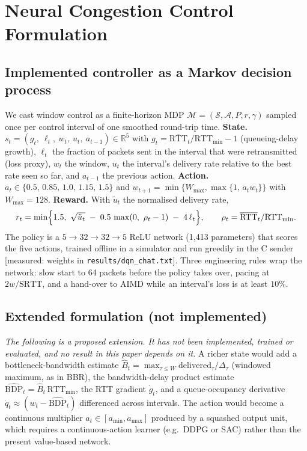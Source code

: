 
\section{Neural Congestion Control Formulation}
\label{sec:mdp}

\subsection{Implemented controller as a Markov decision process}
We cast window control as a finite-horizon MDP $\mathcal{M}=(\mathcal{S},\mathcal{A},P,r,\gamma)$ sampled once per control interval of one smoothed round-trip time.
\textbf{State.} $s_t=(g_t,\ \ell_t,\ w_t,\ u_t,\ a_{t-1})\in\mathbb{R}^5$ with
$g_t=\overline{\mathrm{RTT}}_t/\mathrm{RTT}_{\min}-1$ (queueing-delay growth),
$\ell_t$ the fraction of packets sent in the interval that were retransmitted (loss proxy),
$w_t$ the window, $u_t$ the interval's delivery rate relative to the best rate seen so far, and $a_{t-1}$ the previous action.
\textbf{Action.} $a_t\in\{0.5,\,0.85,\,1.0,\,1.15,\,1.5\}$ and $w_{t+1}=\min\{W_{\max},\max\{1,\,a_t w_t\}\}$ with $W_{\max}=128$.
\textbf{Reward.} With $\tilde u_t$ the normalised delivery rate,
\begin{equation}
r_t=\min\Bigl\{1.5,\ \sqrt{\tilde u_t}\;-\;0.5\,\max(0,\ \rho_t-1)\;-\;4\,\ell_t\Bigr\},\qquad \rho_t=\overline{\mathrm{RTT}}_t/\mathrm{RTT}_{\min}.
\end{equation}
The policy is a $5\!\to\!32\!\to\!32\!\to\!5$ ReLU network (1{,}413 parameters) that scores the five actions, trained offline in a simulator and run greedily in the C sender [measured: weights in \texttt{results/dqn\_chat.txt}].
Three engineering rules wrap the network: slow start to 64 packets before the policy takes over, pacing at $2w/\mathrm{SRTT}$, and a hand-over to AIMD while an interval's loss is at least $10\%$.

\subsection{Extended formulation (not implemented)}
\label{sec:mdp-ext}
\emph{The following is a proposed extension. It has not been implemented, trained or evaluated, and no result in this paper depends on it.}
A richer state would add a bottleneck-bandwidth estimate $\widehat{B}_t=\max_{\tau\le W}\mathrm{delivered}_\tau/\Delta_\tau$ (windowed maximum, as in BBR), the bandwidth-delay product estimate $\widehat{\mathrm{BDP}}_t=\widehat{B}_t\,\mathrm{RTT}_{\min}$, the RTT gradient $\dot g_t$, and a queue-occupancy derivative $\dot q_t\approx(w_t-\widehat{\mathrm{BDP}}_t)$ differenced across intervals.
The action would become a continuous multiplier $a_t\in[a_{\min},a_{\max}]$ produced by a squashed output unit, which requires a continuous-action learner (e.g.\ DDPG or SAC) rather than the present value-based network.

